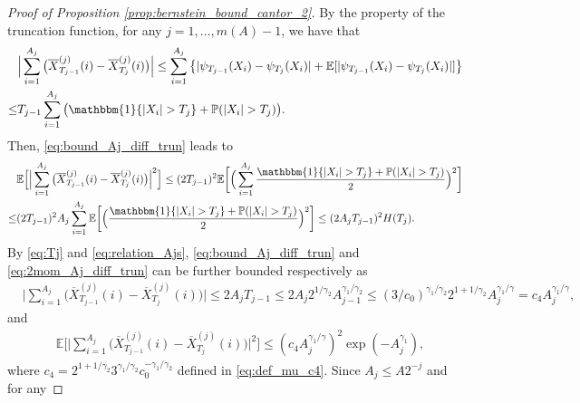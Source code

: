 \documentclass[11pt]{article}
\theoremstyle{plain}
\theoremstyle{definition}
\begin{document}
\begin{proof}[Proof of Proposition \ref{prop:bernstein_bound_cantor_2}]
By the property of the truncation function, for any $j = 1, \dots, m(A)-1$, we have  that
\begin{equation}\label{eq:bound_Aj_diff_trun}
\begin{aligned}
    &\Big|\sum_{i = 1}^{A_j}\big(\overline{X}_{T_{j-1}}^{(j)}(i) - \overline{X}_{T_j}^{(j)}(i)\big)\Big|\leq \sum_{i = 1}^{A_j}\big\{|\psi_{T_{j-1}}(X_i) - \psi_{T_{j}}(X_i)| + \mathbb{E}[|\psi_{T_{j-1}}(X_i) - \psi_{T_{j}}(X_i)|]\big\}\\
    \leq& T_{j-1}\sum_{i = 1}^{A_j}\big(\mathbbm{1}\{|X_i| > T_j\} + \mathbb{P}(|X_i| > T_j)\big).
\end{aligned}
\end{equation}
Then, \eqref{eq:bound_Aj_diff_trun} leads to
\begin{equation}\label{eq:2mom_Aj_diff_trun}
\begin{aligned}
    &\mathbb{E}\Big[\Big|\sum_{i = 1}^{A_j}\big(\overline{X}_{T_{j-1}}^{(j)}(i) - \overline{X}_{T_j}^{(j)}(i)\big)\Big|^2\Big] \leq (2T_{j-1})^2\mathbb{E}\bigg[\Big(\sum_{i = 1}^{A_j}\frac{\mathbbm{1}\{|X_i| > T_j\} + \mathbb{P}(|X_i| > T_j)}{2}\Big)^2\bigg]\\
    \leq& (2T_{j-1})^2A_j\sum_{i = 1}^{A_j}\mathbb{E}\bigg[\Big(\frac{\mathbbm{1}\{|X_i| > T_j\} + \mathbb{P}(|X_i| > T_j)}{2}\Big)^2\bigg] \leq (2A_jT_{j-1})^2H(T_j).
\end{aligned}
\end{equation}
By \eqref{eq:Tj} and \eqref{eq:relation_Ajs}, \eqref{eq:bound_Aj_diff_trun} and \eqref{eq:2mom_Aj_diff_trun} can be further bounded respectively as
\begin{equation}\label{eq:bounded_2AjTj-1}
\begin{aligned}
    &\Big|\sum_{i = 1}^{A_j}\big(\overline{X}_{T_{j-1}}^{(j)}(i) - \overline{X}_{T_j}^{(j)}(i)\big)\Big| \leq 2A_jT_{j-1} \leq 2A_j2^{1/\gamma_2}A_{j-1}^{\gamma_1/\gamma_2} \leq (3/c_0)^{\gamma_1/\gamma_2}2^{1+1/\gamma_2}A_j^{\gamma_1/\gamma} = c_4A_j^{\gamma_1/\gamma},
\end{aligned}
\end{equation}
and
\begin{equation*}
\begin{aligned}
    &\mathbb{E}\Big[\Big|\sum_{i = 1}^{A_j}\big(\overline{X}_{T_{j-1}}^{(j)}(i) - \overline{X}_{T_j}^{(j)}(i)\big)\Big|^2\Big] \leq (c_4A_j^{\gamma_1/\gamma})^2\exp(-A_j^{\gamma_1}),
\end{aligned}
\end{equation*}
where $c_4 = 2^{1+1/\gamma_2}3^{\gamma_1/\gamma_2}c_0^{-\gamma_1/\gamma_2}$ defined in \eqref{eq:def_mu_c4}. Since $A_j \leq A2^{-j}$ and for any 

\end{proof}
\end{document}
